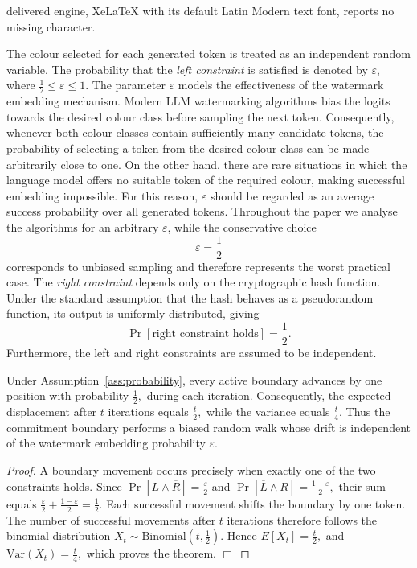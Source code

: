 \documentclass[10pt,a4paper]{amsart}
\begin{document}
delivered engine, XeLaTeX with its default Latin Modern text font, reports no missing character.
\begin{assumption}
\label{ass:probability}
The colour selected for each generated token is treated as an
independent random variable.
The probability that the \emph{left constraint} is satisfied is denoted
by $\varepsilon$, where
$
\frac12 \le \varepsilon \le 1.
$
The parameter $\varepsilon$ models the effectiveness of the watermark
embedding mechanism. Modern LLM watermarking algorithms bias the logits
towards the desired colour class before sampling the next token.
Consequently, whenever both colour classes contain sufficiently many
candidate tokens, the probability of selecting a token from the desired
colour class can be made arbitrarily close to one. On the other hand,
there are rare situations in which the language model offers no suitable
token of the required colour, making successful embedding impossible.
For this reason, $\varepsilon$ should be regarded as an average success
probability over all generated tokens.
Throughout the paper we analyse the algorithms for an arbitrary
$\varepsilon$, while the conservative choice
$$
\varepsilon=\frac12
$$
corresponds to unbiased sampling and therefore represents the worst
practical case.
The \emph{right constraint} depends only on the cryptographic hash
function. Under the standard assumption that the hash behaves as a
pseudorandom function, its output is uniformly distributed, giving
$$
\Pr[\text{right constraint holds}]
=\frac12.
$$
Furthermore, the left and right constraints are assumed to be
independent.
\end{assumption}

\begin{theorem}
Under Assumption~\ref{ass:probability}, every active boundary advances by one position with
probability
$
\frac12,
$
during each iteration. Consequently, the expected displacement after
$t$ iterations equals
$
\frac{t}{2},
$
while the variance equals
$
\frac{t}{4}.
$
Thus the commitment boundary performs a biased random walk whose drift
is independent of the watermark embedding probability
$\varepsilon$.
\end{theorem}

\begin{proof}
A boundary movement occurs precisely when exactly one of the two
constraints holds.
Since
$
\Pr[L\wedge\overline{R}]
=
\frac{\varepsilon}{2}
$
and
$
\Pr[\overline{L}\wedge R]
=
\frac{1-\varepsilon}{2},
$
their sum equals
$
\frac{\varepsilon}{2}
+
\frac{1-\varepsilon}{2}
=
\frac12.
$
Each successful movement shifts the boundary by one token.
The number of successful movements after $t$ iterations therefore
follows the binomial distribution
$
X_t\sim\mathrm{Binomial}
\left(
t,\frac12
\right).
$
Hence
$
E[X_t]
=
\frac{t}{2},
$
and
$
\mathrm{Var}(X_t)
=
\frac{t}{4},
$
which proves the theorem.
\hfill$\Box$
\end{proof}
\end{document}
